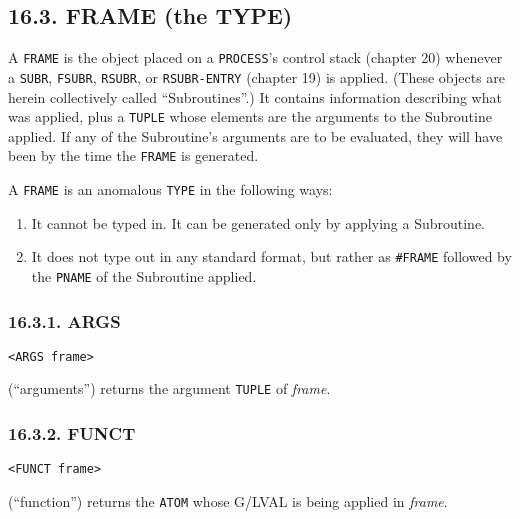 \documentclass[a4paper,]{article}
\providecommand{\tightlist}{%
  \setlength{\itemsep}{0pt}\setlength{\parskip}{0pt}}
\begin{document}
\subsection{16.3. FRAME (the TYPE)}\label{frame-the-type}

A \texttt{FRAME} is the object placed on a \texttt{PROCESS}'s control stack (chapter 20)
whenever a \texttt{SUBR}, \texttt{FSUBR}, \texttt{RSUBR},
or \texttt{RSUBR-ENTRY} (chapter 19) is applied. (These objects are herein collectively called
``Subroutines''.) It contains information describing what was applied, plus a \texttt{TUPLE}
whose elements are the arguments to the Subroutine applied. If any of the Subroutine's arguments are to be evaluated, they
will have been by the time the \texttt{FRAME} is generated.

A \texttt{FRAME} is an anomalous \texttt{TYPE} in the following ways:

\begin{enumerate}
\def\labelenumi{\arabic{enumi}.}
\tightlist
\item
  It cannot be typed in. It can be generated only by applying a Subroutine.
\item
  It does not type out in any standard format, but rather as \texttt{\#FRAME} followed by the \texttt{PNAME} of the
  Subroutine applied.
\end{enumerate}

\subsubsection{16.3.1. ARGS}\label{args-1}

\begin{verbatim}
<ARGS frame>
\end{verbatim}

 (``arguments'') returns the argument \texttt{TUPLE} of \emph{frame}.

\subsubsection{16.3.2. FUNCT}\label{funct}

\begin{verbatim}
<FUNCT frame>
\end{verbatim}

 (``function'') returns the \texttt{ATOM} whose G/LVAL is being applied
in \emph{frame}.
\end{document}
